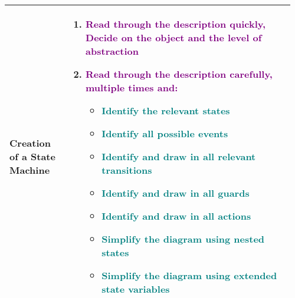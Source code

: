 \documentclass[main.tex,fontsize=8pt,paper=a4,paper=portrait,DIV=calc,]{scrartcl}
\begin{document}
\pagebreak
\begin{table}[ht!]
\begin{tabular}{|m{0.2\linewidth}|m{0.755\linewidth}|}
\hline
Creation of a State Machine & 
\vspace{2mm}
\begin{enumerate}
  \item \textcolor{purple}{Read through the description quickly,\newline
    Decide on the \textbf{object} and the \textbf{level of abstraction}}
  \item \textcolor{purple}{Read through the description \textbf{carefully, multiple times and:}}\newline
    \begin{itemize}
    \item \textcolor{teal}{Identify the relevant \textbf{states}}
    \item \textcolor{teal}{Identify all possible \textbf{events}}
    \item \textcolor{teal}{Identify and draw in \textbf{all relevant transitions}}
    \item \textcolor{teal}{Identify and draw in \textbf{all guards}}
    \item \textcolor{teal}{Identify and draw in \textbf{all actions}}
    \item \textcolor{teal}{Simplify the diagram using \textbf{nested states}}
    \item \textcolor{teal}{Simplify the diagram using \textbf{extended state variables}}
    \vspace{-3mm}
    \end{itemize}
\end{enumerate}\\
\hline
\end{tabular}
\end{table}
\end{document}
